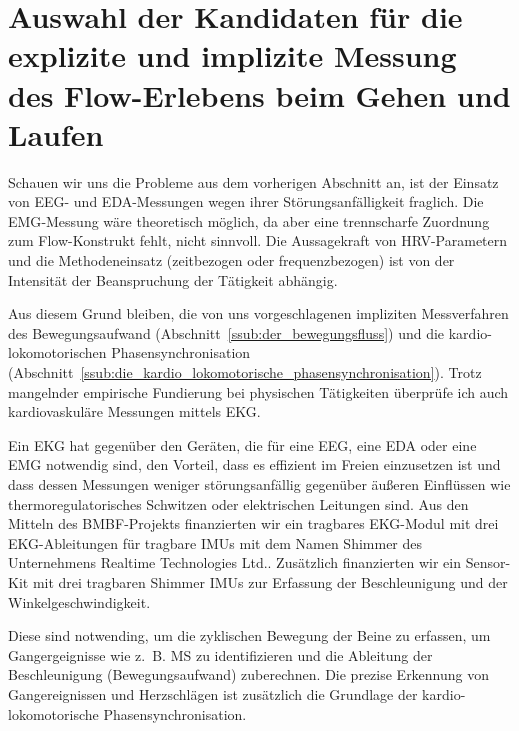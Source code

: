 

\section{Auswahl der Kandidaten für die explizite und implizite Messung des Flow-Erlebens beim Gehen und Laufen} 

\label{sec:auswahl_der_kandidaten_fur_die_explizite_und_implizite_messung_des_flow_erlebens_beim_gehen_und_laufen}

Schauen wir uns die Probleme aus dem vorherigen Abschnitt an, ist der Einsatz von \ac{EEG}- und \ac{EDA}-Messungen wegen ihrer Störungsanfälligkeit fraglich. Die \ac{EMG}-Messung wäre theoretisch möglich, da aber eine trennscharfe Zuordnung zum Flow-Konstrukt fehlt, nicht sinnvoll. Die Aussagekraft von \ac{HRV}-Parametern und die Methodeneinsatz (zeitbezogen oder frequenzbezogen) ist von der Intensität der Beanspruchung der Tätigkeit abhängig.

Aus diesem Grund bleiben, die von uns vorgeschlagenen impliziten Messverfahren des Bewegungsaufwand (Abschnitt~\ref{ssub:der_bewegungsfluss}) und die kardio-lokomotorischen Phasensynchronisation (Abschnitt~\ref{ssub:die_kardio_lokomotorische_phasensynchronisation}). Trotz mangelnder empirische Fundierung bei physischen Tätigkeiten überprüfe ich auch kardiovaskuläre Messungen mittels \ac{EKG}. 

Ein \ac{EKG} hat gegenüber den Geräten, die für eine \ac{EEG}, eine \ac{EDA} oder eine \ac{EMG} notwendig sind, den Vorteil, dass es effizient im Freien einzusetzen ist und dass dessen Messungen weniger störungsanfällig gegenüber äußeren Einflüssen wie thermoregulatorisches Schwitzen oder elektrischen Leitungen sind. Aus den Mitteln des \acs{BMBF}-Projekts finanzierten wir ein tragbares EKG-Modul mit drei \ac{EKG}-Ableitungen für tragbare \acp{IMU} mit dem Namen Shimmer des Unternehmens Realtime Technologies Ltd.. Zusätzlich finanzierten wir ein Sensor-Kit mit drei tragbaren Shimmer \acp{IMU} zur Erfassung der Beschleunigung und der Winkelgeschwindigkeit.

Diese sind notwending, um die zyklischen Bewegung der Beine zu erfassen, um Gangergeignisse wie z.~B. \ac{MS} zu identifizieren und die Ableitung der Beschleunigung (Bewegungsaufwand) zuberechnen. Die prezise Erkennung von Gangereignissen und Herzschlägen ist zusätzlich die Grundlage der kardio-lokomotorische Phasensynchronisation. 

